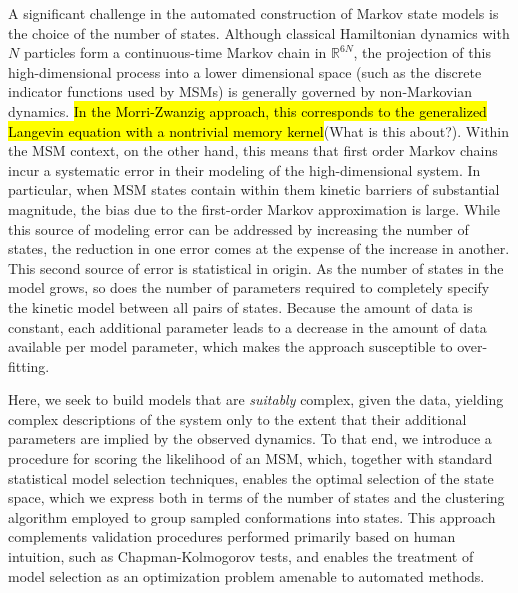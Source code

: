 \documentclass[journal=jpcbfk, layout=traditional, manuscript=article]{achemso}
\begin{document}
A significant challenge in the automated construction of Markov state models is the choice of the number of states\cite{McGibbon2013Learning}. Although classical Hamiltonian dynamics with $N$ particles form a continuous-time Markov chain in $\mathbb{R}^{6N}$\cite{vanKampen}, the projection of this high-dimensional process into a lower dimensional space (such as the discrete indicator functions used by MSMs) is generally governed by non-Markovian dynamics. \hl{In the Morri-Zwanzig approach, this corresponds to the generalized Langevin equation with a nontrivial memory kernel}(What is this about?)\cite{ZM}. Within the MSM context, on the other hand, this means that first order Markov chains incur a systematic error in their modeling of the high-dimensional system. In particular, when MSM states contain within them kinetic barriers of substantial magnitude, the bias due to the first-order Markov approximation is large. While this source of modeling error can be addressed by increasing the number of states, the reduction in one error comes at the expense of the increase in another. This second source of error is statistical in origin. As the number of states in the model grows, so does the number of parameters required to completely specify the kinetic model between all pairs of states. Because the amount of data is constant, each additional parameter leads to a decrease in the amount of data available per model parameter, which makes the approach susceptible to over-fitting.

Here, we seek to build models that are \emph{suitably} complex, given the data, yielding complex descriptions of the system only to the extent that their additional parameters are implied by the observed dynamics. To that end, we introduce a procedure for scoring the likelihood of an MSM, which, together with standard statistical model selection techniques, enables the optimal selection of the state space, which we express both in terms of the number of states and the clustering algorithm employed to group sampled conformations into states. This approach complements validation procedures performed primarily based on human intuition, such as Chapman-Kolmogorov tests, and enables the treatment of model selection as an optimization problem amenable to automated methods.
\end{document}
